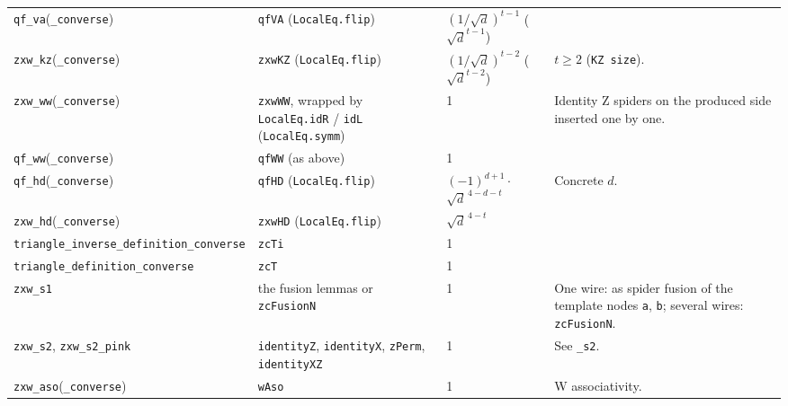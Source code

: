 {\begin{xltabular}{\linewidth}{@{}p{4.3cm}p{3.6cm}p{2.2cm}X@{}}
\texttt{qf\_\allowbreak{}va}(\texttt{\_\allowbreak{}converse}) & \texttt{qfVA} (\texttt{LocalEq.flip\textquotesingle{}}) & $(1/\sqrt d)^{t-1}$
  ($\sqrt d^{t-1}$) & \\
\texttt{zxw\_\allowbreak{}kz}(\texttt{\_\allowbreak{}converse}) & \texttt{zxwKZ} (\texttt{LocalEq.flip\textquotesingle{}}) & $(1/\sqrt d)^{t-2}$
  ($\sqrt d^{t-2}$) & $t\ge2$ (\texttt{KZ size}). \\
\texttt{zxw\_\allowbreak{}ww}(\texttt{\_\allowbreak{}converse}) & \texttt{zxwWW}, wrapped by \texttt{LocalEq.idR} / \texttt{idL}
  (\texttt{LocalEq.symm\textquotesingle{}}) & 1 & Identity Z spiders on the produced side inserted one by one. \\
\texttt{qf\_\allowbreak{}ww}(\texttt{\_\allowbreak{}converse}) & \texttt{qfWW} (as above) & 1 & \\
\texttt{qf\_\allowbreak{}hd}(\texttt{\_\allowbreak{}converse}) & \texttt{qfHD} (\texttt{LocalEq.flip\textquotesingle{}}) &
  $(-1)^{d+1}\cdot{}$\allowbreak$\sqrt d^{\,4-d-t}$ & Concrete $d$. \\
\texttt{zxw\_\allowbreak{}hd}(\texttt{\_\allowbreak{}converse}) & \texttt{zxwHD} (\texttt{LocalEq.flip\textquotesingle{}}) & $\sqrt d^{\,4-t}$ & \\
\texttt{triangle\_\allowbreak{}inverse\_\allowbreak{}definition\_\allowbreak{}converse} & \texttt{zcTi} & 1 & \\
\texttt{triangle\_\allowbreak{}definition\_\allowbreak{}converse} & \texttt{zcT} & 1 & \\
\texttt{zxw\_\allowbreak{}s1} & the fusion lemmas or \texttt{zcFusionN} & 1 & One wire: as spider fusion of the
  template nodes \texttt{a}, \texttt{b}; several wires: \texttt{zcFusionN}. \\
\texttt{zxw\_\allowbreak{}s2}, \texttt{zxw\_\allowbreak{}s2\_\allowbreak{}pink} & \texttt{identityZ}, \texttt{identityX}, \texttt{zPerm},
  \texttt{identityXZ} & 1 & See \texttt{\_\allowbreak{}s2}. \\
\texttt{zxw\_\allowbreak{}aso}(\texttt{\_\allowbreak{}converse}) & \texttt{wAso} & 1 & W associativity. \\
\bottomrule
\end{xltabular}

}
